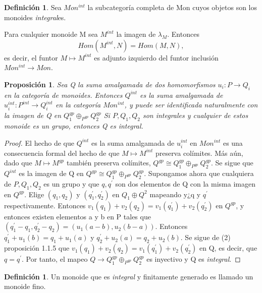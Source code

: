 \documentclass[12pt,spanish]{amsart}
\newtheorem{prop}[Theorem]{Proposición}
\theoremstyle{definition}
\newtheorem{Def}[Theorem]{Definición}
\theoremstyle{remark}
\begin{document}
\begin{Def}
Sea $Mon^{int}$ la subcategoría completa de Mon cuyos objetos son los monoides \textit{integral}es. 
\end{Def}

Para cualquier monoide M sea $M^{int}$ la imagen de $\lambda_{M}$. Entonces
$$Hom(M^{int},N)=Hom(M,N),$$
es decir, el funtor $M \mapsto M^{int}$ es adjunto izquierdo del funtor inclusión $Mon^{int} \to Mon.$

\begin{prop}
Sea Q la suma amalgamada de dos homomorfismos $u_{i}:P \to Q_{i}$ en la categoría de monoides. Entonces $Q^{int}$ es la suma amalgamada de $u_{i}^{int}:P^{int} \to Q_{i}^{int}$ en la categoría $Mon^{int}$, y puede ser identificada naturalmente con la imagen de Q en $Q_{1}^{gp } \oplus_{P^{gp}}Q_{2}^{gp}$ Si $P,Q_{1},Q_{2}$ son \textit{integral}es y cualquier de estos monoide es un grupo, entonces Q es \textit{integral}. 
\end{prop}

\begin{proof}
El hecho de que $Q^{int}$ es la suma amalgamada de $u_{i}^{int}$ en $Mon^{int}$ es una consecuencia formal del hecho de que $M \mapsto M^{int}$ preserva colímites. Más aún, dado que $M \mapsto M^{gp}$ también preserva colímites, $Q^{gp} \cong Q_{1}^{gp} \oplus_{P^{gp}} Q_{2}^{gp}$. Se sigue que $Q^{int}$ es la imagen de Q en $Q^{gp} \cong Q_{1}^{gp} \oplus_{P^{gp}} Q_{2}^{gp}$. Supongamos ahora que cualquiera de $P,Q_{1},Q_{2}$ es un grupo y que $q,q^{\prime}$ son dos elementos de Q con la misma imagen en $Q^{gp}$. Elige $(q_{1},q_{2})$ y $(q_{1}^{\prime},q_{2}^{\prime})$ en $Q_{1}\oplus Q^{2}$ mapeando y¿q y $q^{\prime}$ respectivamente. Entonces $v_{1}(q_{1})+v_{2}(q_{2})=v_{1}(q_{1}^{\prime})+v_{2}(q_{2}^{\prime})$ en $Q^{gp}$, y entonces existen elementos a y b en P tales que $(q_{1}^{\prime}-q_{1},q_{2}^{\prime}-q_{2})= (u_{1}(a-b),u_{2}(b-a))$. Entonces $q_{1}^{\prime}+u_{1}(b)=q_{1}+u_{1}(a)$ y $q_{2}^{\prime}+u_{2}(a)=q_{2}+u_{2}(b)$. Se sigue de (2) proposición 1.1.5 que $v_{1}(q_{1})+v_{2}(q_{2})= v_{1}(q_{1}^{\prime})+v_{2}(q_{2}^{\prime})$ en Q, es decir, que $q=q^{\prime}$. Por tanto, el mapeo $Q\to Q_{1}^{gp}\oplus_{P^{gp}}Q_{2}^{gp}$ es inyectivo y Q es \textit{integral}. 
\end{proof}

\begin{Def}
Un monoide que es \textit{integral} y finitamente generado es llamado un monoide fino.
\end{Def}
\end{document}

